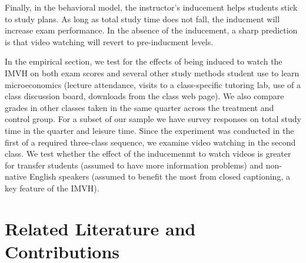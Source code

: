 \documentclass[12pt]{article}
\begin{document}
Finally, in the behavioral model, the instructor's inducement helps students stick to study plans. As long as total study time does not fall, the inducment will increase exam performance. In the absence of the inducement, a sharp prediction is that video watching will revert to pre-inducment levels.

In the empirical section, we test for the effects of being induced to watch the IMVH on both exam scores and several other study methods student use to learn microeconomics (lecture attendance, visits to a class-specific tutoring lab, use of a class discussion board, downloads from the class web page). We also compare grades in other classes taken in the same quarter across the treatment and control group. For a subset of our sample we have survey responses on total study time in the quarter and leisure time. Since the experiment was conducted in the first of a required three-class sequence, we examine video watching in the second class. We test whether the effect of the inducemenmt to watch videos is greater for transfer students (assumed to have more information problems) and non-native English speakers (assumed to benefit the most from closed captioning, a key feature of the IMVH).

\section{Related Literature and Contributions} \label{background}
\end{document}
